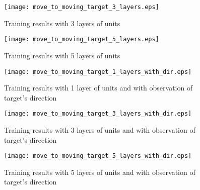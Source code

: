 \begin{figure}
    \begin{center}
        \texttt{[image: move\_to\_moving\_target\_3\_layers.eps]}
        \caption{Training results with 3 layers of units}
        \label{train_results_moving_3_layers}
    \end{center}
\end{figure}

\begin{figure}
    \begin{center}
        \texttt{[image: move\_to\_moving\_target\_5\_layers.eps]}
        \caption{Training results with 5 layers of units}
        \label{train_results_moving_5_layers}
    \end{center}
\end{figure}

\begin{figure}
    \begin{center}
        \texttt{[image: move\_to\_moving\_target\_1\_layers\_with\_dir.eps]}
        \caption{Training results with 1 layer of units and with observation of target's direction}
        \label{train_results_moving_1_layers_with_dir}
    \end{center}
\end{figure}

\begin{figure}
    \begin{center}
        \texttt{[image: move\_to\_moving\_target\_3\_layers\_with\_dir.eps]}
        \caption{Training results with 3 layers of units and with observation of target's direction}
        \label{train_results_moving_3_layers_with_dir}
    \end{center}
\end{figure}

\begin{figure}
    \begin{center}
        \texttt{[image: move\_to\_moving\_target\_5\_layers\_with\_dir.eps]}
        \caption{Training results with 5 layers of units and with observation of target's direction}
        \label{train_results_moving_5_layers_with_dir}
    \end{center}
\end{figure}



